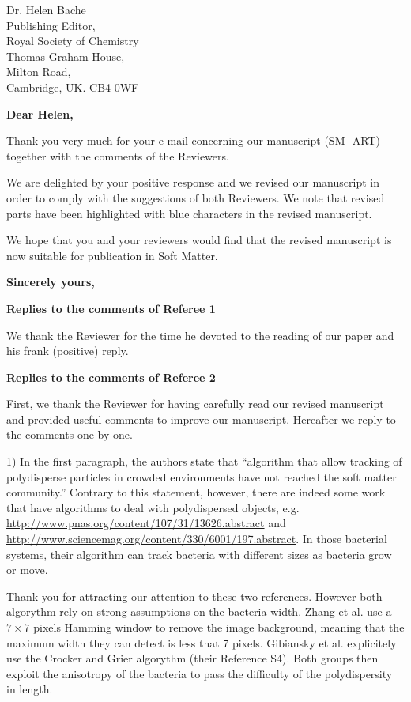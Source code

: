 \documentclass[a4paper, rebuttal, parskip=true, firsthead=false, fromemail=true, foldmarks=false]{scrlttr2}
\begin{document}
 
\begin{letter}{Dr. Helen Bache\\
Publishing Editor,\\
Royal Society of Chemistry\\
Thomas Graham House,\\
Milton Road,\\
Cambridge, UK. CB4 0WF}
\opening{\bf Dear Helen,}

Thank you very much for your e-mail concerning our manuscript (SM\nobreakdash- ART) together with the comments of the Reviewers.

We are delighted by your positive response and we revised our manuscript in order to comply with the suggestions of both Reviewers. We note that revised parts have been highlighted with blue characters in the revised manuscript. 


We hope that you and your reviewers would find that the revised manuscript is now suitable for publication in Soft Matter. 

\closing{\bf Sincerely yours,} 
\clearpage

\textsf{\textbf{Replies to the comments of Referee 1}}

We thank the Reviewer for the time he devoted to the reading of our paper and his frank (positive) reply.

\textsf{\textbf{Replies to the comments of Referee 2}}

First, we thank the Reviewer for having carefully read our revised manuscript and provided useful comments to improve our manuscript. 
Hereafter we reply to the comments one by one.

\begin{quotationi}
1)      In the first paragraph, the authors state that ``algorithm that allow tracking of polydisperse particles in crowded environments have not reached the soft matter community.'' Contrary to this statement, however, there are indeed some work that have algorithms to deal with polydispersed objects, e.g. \url{http://www.pnas.org/content/107/31/13626.abstract} and \url{http://www.sciencemag.org/content/330/6001/197.abstract}. In those bacterial systems, their algorithm can track bacteria with different sizes as bacteria grow or move.
\end{quotationi}

Thank you for attracting our attention to these two references. However both algorythm rely on strong assumptions on the bacteria width. Zhang et al. use a $7\times 7$ pixels Hamming window to remove the image background, meaning that the maximum width they can detect is less that 7 pixels. Gibiansky et al. explicitely use the Crocker and Grier algorythm (their Reference S4). Both groups then exploit the anisotropy of the bacteria to pass the difficulty of the polydispersity in length.


\end{letter}
\end{document}
